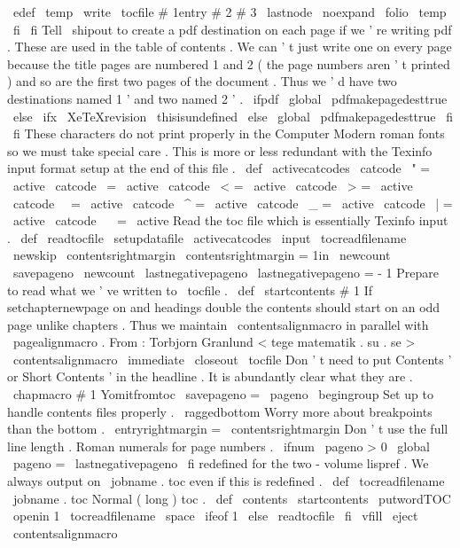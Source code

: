 {{{{{\
edef
\
temp
{
%
\
write
\
tocfile
{
#
1entry
{
#
2
}
{
#
3
}
{
\
lastnode
}
{
\
noexpand
\
folio
}
}
}
%
\
temp
}
%
\
fi
\
fi
%
%
Tell
\
shipout
to
create
a
pdf
destination
on
each
page
if
we
'
re
%
writing
pdf
.
These
are
used
in
the
table
of
contents
.
We
can
'
t
%
just
write
one
on
every
page
because
the
title
pages
are
numbered
%
1
and
2
(
the
page
numbers
aren
'
t
printed
)
and
so
are
the
first
%
two
pages
of
the
document
.
Thus
we
'
d
have
two
destinations
named
%
1
'
and
two
named
2
'
.
\
ifpdf
\
global
\
pdfmakepagedesttrue
\
else
\
ifx
\
XeTeXrevision
\
thisisundefined
\
else
\
global
\
pdfmakepagedesttrue
\
fi
\
fi
}
%
These
characters
do
not
print
properly
in
the
Computer
Modern
roman
%
fonts
so
we
must
take
special
care
.
This
is
more
or
less
redundant
%
with
the
Texinfo
input
format
setup
at
the
end
of
this
file
.
%
\
def
\
activecatcodes
{
%
\
catcode
\
"
=
\
active
\
catcode
\
=
\
active
\
catcode
\
<
=
\
active
\
catcode
\
>
=
\
active
\
catcode
\
\
=
\
active
\
catcode
\
^
=
\
active
\
catcode
\
_
=
\
active
\
catcode
\
|
=
\
active
\
catcode
\
~
=
\
active
}
%
Read
the
toc
file
which
is
essentially
Texinfo
input
.
\
def
\
readtocfile
{
%
\
setupdatafile
\
activecatcodes
\
input
\
tocreadfilename
}
\
newskip
\
contentsrightmargin
\
contentsrightmargin
=
1in
\
newcount
\
savepageno
\
newcount
\
lastnegativepageno
\
lastnegativepageno
=
-
1
%
Prepare
to
read
what
we
'
ve
written
to
\
tocfile
.
%
\
def
\
startcontents
#
1
{
%
%
If
setchapternewpage
on
and
headings
double
the
contents
should
%
start
on
an
odd
page
unlike
chapters
.
Thus
we
maintain
%
\
contentsalignmacro
in
parallel
with
\
pagealignmacro
.
%
From
:
Torbjorn
Granlund
<
tege
matematik
.
su
.
se
>
\
contentsalignmacro
\
immediate
\
closeout
\
tocfile
%
%
Don
'
t
need
to
put
Contents
'
or
Short
Contents
'
in
the
headline
.
%
It
is
abundantly
clear
what
they
are
.
\
chapmacro
{
#
1
}
{
Yomitfromtoc
}
{
}
%
%
\
savepageno
=
\
pageno
\
begingroup
%
Set
up
to
handle
contents
files
properly
.
\
raggedbottom
%
Worry
more
about
breakpoints
than
the
bottom
.
\
entryrightmargin
=
\
contentsrightmargin
%
Don
'
t
use
the
full
line
length
.
%
%
Roman
numerals
for
page
numbers
.
\
ifnum
\
pageno
>
0
\
global
\
pageno
=
\
lastnegativepageno
\
fi
}
%
redefined
for
the
two
-
volume
lispref
.
We
always
output
on
%
\
jobname
.
toc
even
if
this
is
redefined
.
%
\
def
\
tocreadfilename
{
\
jobname
.
toc
}
%
Normal
(
long
)
toc
.
%
\
def
\
contents
{
%
\
startcontents
{
\
putwordTOC
}
%
\
openin
1
\
tocreadfilename
\
space
\
ifeof
1
\
else
\
readtocfile
\
fi
\
vfill
\
eject
\
contentsalignmacro
%
}}}}
